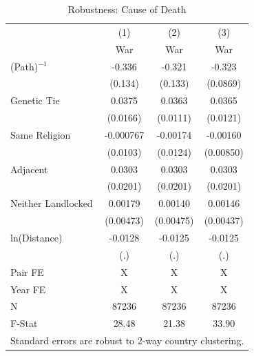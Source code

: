 \documentclass{article}
\begin{document}
\begin{table}[htbp]\centering
\caption{Robustness: Cause of Death \label{tab:DeathCauseRobust}}
\begin{tabular}{l*{3}{c}}
\toprule
                    &\multicolumn{1}{c}{(1)}&\multicolumn{1}{c}{(2)}&\multicolumn{1}{c}{(3)}\\
                    &\multicolumn{1}{c}{War}&\multicolumn{1}{c}{War}&\multicolumn{1}{c}{War}\\
\midrule
(Path)$^{-1}$       &      -0.336&      -0.321&      -0.323\\
                    &     (0.134)&     (0.133)&    (0.0869)\\
\addlinespace
Genetic Tie         &      0.0375&      0.0363&      0.0365\\
                    &    (0.0166)&    (0.0111)&    (0.0121)\\
\addlinespace
Same Religion       &   -0.000767&    -0.00174&    -0.00160\\
                    &    (0.0103)&    (0.0124)&   (0.00850)\\
\addlinespace
Adjacent            &      0.0303&      0.0303&      0.0303\\
                    &    (0.0201)&    (0.0201)&    (0.0201)\\
\addlinespace
Neither Landlocked  &     0.00179&     0.00140&     0.00146\\
                    &   (0.00473)&   (0.00475)&   (0.00437)\\
\addlinespace
ln(Distance)        &     -0.0128&     -0.0125&     -0.0125\\
                    &         (.)&         (.)&         (.)\\
\midrule
Pair FE             &           X&           X&           X\\
Year FE             &           X&           X&           X\\
N                   &       87236&       87236&       87236\\
F-Stat              &       28.48&       21.38&       33.90\\
\bottomrule
\multicolumn{4}{l}{\footnotesize Standard errors are robust to 2-way country clustering.}\\
\end{tabular}
\end{table}
\end{document}
